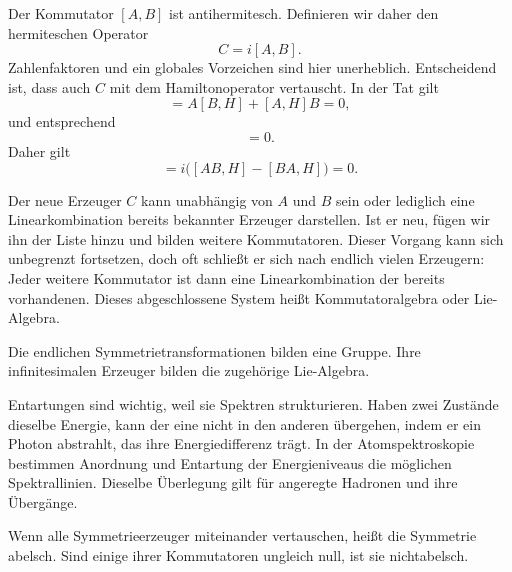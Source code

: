 Der Kommutator \([A,B]\) ist antihermitesch. Definieren wir daher den hermiteschen Operator
\begin{equation}
C=i[A,B].
\end{equation}
Zahlenfaktoren und ein globales Vorzeichen sind hier unerheblich. Entscheidend ist, dass auch \(C\) mit dem Hamiltonoperator vertauscht. In der Tat gilt
\begin{equation}
[AB,H]
=A[B,H]+[A,H]B=0,
\end{equation}
und entsprechend
\begin{equation}
[BA,H]=0.
\end{equation}
Daher gilt
\begin{equation}
[C,H]
=i\bigl([AB,H]-[BA,H]\bigr)=0.
\end{equation}

Der neue Erzeuger \(C\) kann unabhängig von \(A\) und \(B\) sein oder lediglich eine Linearkombination bereits bekannter Erzeuger darstellen. Ist er neu, fügen wir ihn der Liste hinzu und bilden weitere Kommutatoren. Dieser Vorgang kann sich unbegrenzt fortsetzen, doch oft schließt er sich nach endlich vielen Erzeugern: Jeder weitere Kommutator ist dann eine Linearkombination der bereits vorhandenen. Dieses abgeschlossene System heißt Kommutatoralgebra oder Lie-Algebra.

Die endlichen Symmetrietransformationen bilden eine Gruppe. Ihre infinitesimalen Erzeuger bilden die zugehörige Lie-Algebra.

Entartungen sind wichtig, weil sie Spektren strukturieren. Haben zwei Zustände dieselbe Energie, kann der eine nicht in den anderen übergehen, indem er ein Photon abstrahlt, das ihre Energiedifferenz trägt. In der Atomspektroskopie bestimmen Anordnung und Entartung der Energieniveaus die möglichen Spektrallinien. Dieselbe Überlegung gilt für angeregte Hadronen und ihre Übergänge.

\begin{classroomqa}
\end{classroomqa}

Wenn alle Symmetrieerzeuger miteinander vertauschen, heißt die Symmetrie abelsch. Sind einige ihrer Kommutatoren ungleich null, ist sie nichtabelsch.

